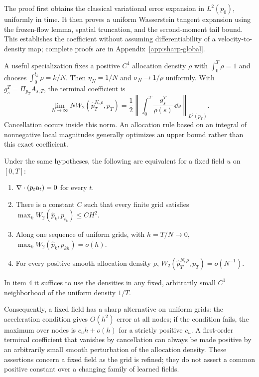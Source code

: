 The proof first obtains the classical variational error expansion in
$L^2(p_0)$, uniformly in time.  It then proves a uniform Wasserstein
tangent expansion using the frozen-flow lemma, spatial truncation, and
the second-moment tail bound.  This establishes the coefficient without
assuming differentiability of a velocity-to-density map; complete
proofs are in Appendix~\ref{app:sharp-global}.

A useful specialization fixes a positive $C^1$ allocation density
$\rho$ with $\int_0^T\rho=1$ and chooses
$\int_0^{t_k}\rho=k/N$.  Then $\eta_N=1/N$ and
$\sigma_N\to1/\rho$ uniformly.  With
$g_s^T=\Pi_{p_T}A_{s,T}$, the terminal coefficient is
\begin{equation}
 \lim_{N\to\infty}N W_2(\widehat p_T^{N,\rho},p_T)
 =\frac12\left\|\int_0^T\frac{g_s^T}{\rho(s)}\,\dd s
             \right\|_{L^2(p_T)}.
 \label{eq:sharp-schedule-coefficient}
\end{equation}
Cancellation occurs inside this norm.  An allocation rule based on an
integral of nonnegative local magnitudes generally optimizes an upper
bound rather than this exact coefficient.

\begin{theorem}
\label{thm:global-ap-characterization}
Under the same hypotheses, the following are equivalent for a fixed
field $u$ on $[0,T]$:
\begin{enumerate}
\item $\nabla\cdot(p_t\mathbf a_t)=0$ for every $t$.
\item There is a constant $C$ such that every finite grid satisfies
      $\max_kW_2(\widehat p_k,p_{t_k})\le CH^2$.
\item Along one sequence of uniform grids, with $h=T/N\to0$,
      $\max_kW_2(\widehat p_k,p_{kh})=o(h)$.
\item For every positive smooth allocation density $\rho$,
      $W_2(\widehat p_T^{N,\rho},p_T)=o(N^{-1})$.
\end{enumerate}
In item 4 it suffices to use the densities in any fixed, arbitrarily
small $C^1$ neighborhood of the uniform density $1/T$.
\end{theorem}

Consequently, a fixed field has a sharp alternative on uniform grids:
the acceleration condition gives $O(h^2)$ error at all nodes; if the
condition fails, the maximum over nodes is $c_u h+o(h)$ for a strictly
positive $c_u$.  A first-order terminal coefficient that vanishes by
cancellation can always be made positive by an arbitrarily small smooth
perturbation of the allocation density.  These assertions concern a
fixed field as the grid is refined; they do not assert a common positive
constant over a changing family of learned fields.

